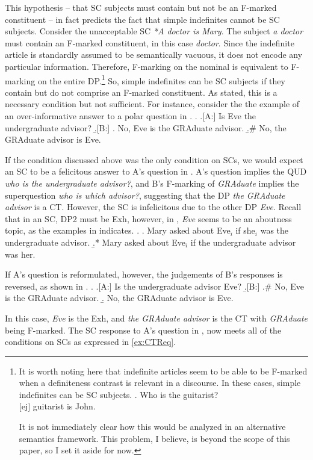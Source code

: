 \documentclass[
	letterpaper,
]{article}
\begin{document}
This hypothesis -- that SC subjects must contain but not be an F-marked constituent -- in fact predicts the fact that simple indefinites cannot be SC subjects.
Consider the unacceptable SC \textit{*A doctor is Mary}.
The subject \textit{a doctor} must contain an F-marked constituent, in this case \textit{doctor}.
Since the indefinite article is standardly assumed to be semantically vacuous, it does not encode any particular information.
Therefore, F-marking on the nominal is equivalent to F-marking on the entire DP.\footnote{
It is worth noting here that indefinite articles seem to be able to be F-marked when a definiteness contrast is relevant in a discourse.
In these cases, simple indefinites can be SC subjects.
\ex. Who is the guitarist?\\
$[$ej$]$ guitarist is John.

It is not immediately clear how this would be analyzed in an alternative semantics framework.
This problem, I believe, is beyond the scope of this paper, so I set it aside for now.
}
So, simple indefinites can be SC subjects if they contain but do not comprise an F-marked constituent.
As stated, this is a necessary condition but not sufficient.
For instance, consider the the example of an over-informative answer to a polar question in \Next \parencite[adapted from][]{mikkelsen2008specification}.
\ex.
\a.[A:] Is Eve the undergraduate advisor?
\b.[B:]
\a. No, Eve is the GRAduate advisor.
\b.\# No, the GRAduate advisor is Eve.

If the condition discussed above was the only condition on SCs, we would expect an SC to be a felicitous answer to A's question in \Last.
A's question implies the QUD \textit{who is the undergraduate advisor?}, and B's F-marking of \textit{GRAduate} implies the superquestion \textit{who is which advisor?}, suggesting that the DP \textit{the GRAduate advisor} is a CT.
However, the SC is infelicitous due to the other DP \textit{Eve}.
Recall that in an SC, DP2 must be Exh, however, in \Last, \textit{Eve} seems to be an aboutness topic, as the examples in \Next indicates.
\ex. 
\a. Mary asked about Eve$_i$ if she$_i$ was the undergraduate advisor.
\b.* Mary asked about Eve$_i$ if the undergraduate advisor was her.

If A's question is reformulated, however, the judgements of B's responses is reversed, as shown in \Next.
\ex.
\a.[A:] Is the undergraduate advisor Eve?
\b.[B:]
\a.\# No, Eve is the GRAduate advisor.
\b. No, the GRAduate advisor is Eve.

In this case, \textit{Eve} is the Exh, and \textit{the GRAduate advisor} is the CT with \textit{GRAduate} being F-marked.
The SC response to A's question in \Last, now meets all of the conditions on SCs as expressed in \ref{ex:CTReq}.
\end{document}
